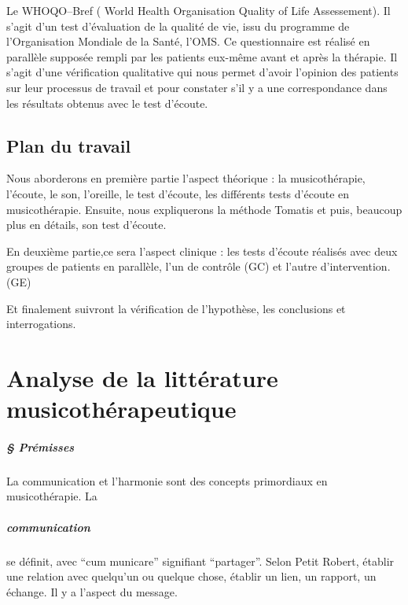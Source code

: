 	
	
        
   Le WHOQO--Bref ( World Health
   Organisation Quality of Life Assessement). Il s'agit d'un test d'évaluation de la qualité de vie, issu du
	programme de l'Organisation Mondiale de la Santé, l'OMS.
	Ce questionnaire est réalisé en parallèle supposée rempli par les patients eux-même  avant et après la thérapie.
	Il s'agit d'une vérification qualitative qui nous permet
        d'avoir l'opinion des patients sur leur processus de travail
        et  pour constater s'il y a une correspondance dans 
        les résultats obtenus avec le test d'écoute. 
	
	
	 


\section*{Plan du travail}


Nous aborderons en première partie l'aspect théorique : la musicothérapie, l'écoute, le son, l'oreille, le 
test d'écoute, les différents tests d'écoute en musicothérapie.  Ensuite, nous 
expliquerons  la méthode Tomatis
et puis, beaucoup plus en détails, son test d'écoute.
 
En deuxième partie,ce sera l'aspect clinique : les tests d'écoute réalisés  avec deux groupes 
de patients en parallèle, l'un de contrôle (GC) et l'autre d'intervention.(GE)

Et finalement suivront la vérification de l'hypothèse, les conclusions et 
interrogations. 


	


\chapter{Analyse de la littérature musicothérapeutique}

\paragraph{§ Prémisses}

La communication et l'harmonie sont des concepts primordiaux en
musicothérapie.
La \paragraph{communication} se définit, avec ``cum
municare'' signifiant ``partager''. Selon Petit Robert, établir une
relation avec quelqu'un ou quelque chose, établir un
lien, un rapport, un échange. Il y a l'aspect du message.

